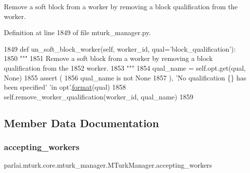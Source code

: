 \begin{DoxyVerb}Remove a soft block from a worker by removing a block qualification from the
worker.
\end{DoxyVerb}
 

Definition at line 1849 of file mturk\+\_\+manager.\+py.


\begin{DoxyCode}
1849     \textcolor{keyword}{def }un\_soft\_block\_worker(self, worker\_id, qual='block\_qualification'):
1850         \textcolor{stringliteral}{"""}
1851 \textcolor{stringliteral}{        Remove a soft block from a worker by removing a block qualification from the}
1852 \textcolor{stringliteral}{        worker.}
1853 \textcolor{stringliteral}{        """}
1854         qual\_name = self.opt.get(qual, \textcolor{keywordtype}{None})
1855         \textcolor{keyword}{assert} (
1856             qual\_name \textcolor{keywordflow}{is} \textcolor{keywordflow}{not} \textcolor{keywordtype}{None}
1857         ), \textcolor{stringliteral}{'No qualification \{\} has been specified'} \textcolor{stringliteral}{'in opt'}.\hyperlink{namespaceparlai_1_1chat__service_1_1services_1_1messenger_1_1shared__utils_a32e2e2022b824fbaf80c747160b52a76}{format}(qual)
1858         self.remove\_worker\_qualification(worker\_id, qual\_name)
1859 
\end{DoxyCode}


\subsection{Member Data Documentation}
\mbox{\label{classparlai_1_1mturk_1_1core_1_1mturk__manager_1_1MTurkManager_ae070143dc4cbb806d0687c7777f0c422}} 
\subsubsection{\texorpdfstring{accepting\+\_\+workers}{accepting\_workers}}
{\footnotesize\ttfamily parlai.\+mturk.\+core.\+mturk\+\_\+manager.\+M\+Turk\+Manager.\+accepting\+\_\+workers}



